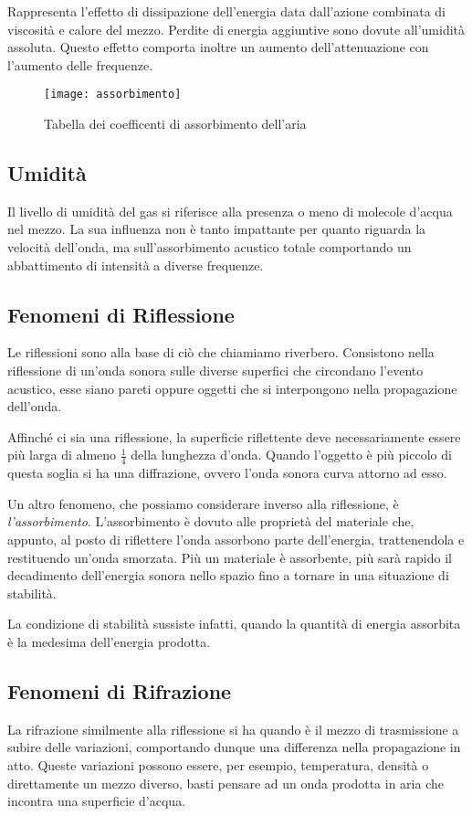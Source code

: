 Rappresenta l’effetto di dissipazione dell’energia data dall’azione combinata
di viscosità e calore del mezzo. Perdite di energia aggiuntive sono dovute
all’umidità assoluta. Questo effetto comporta inoltre un aumento
dell’attenuazione con l’aumento delle frequenze.

\begin{figure}[h]
\centering
\texttt{[image: assorbimento]}
\caption{Tabella dei coefficenti di assorbimento dell'aria}
\label{fig:assorbimento}
\end{figure}

\subsection{Umidità}
Il livello di umidità del gas si riferisce alla presenza o meno di molecole
d’acqua nel mezzo. La sua influenza non è tanto impattante per quanto riguarda
la velocità dell’onda, ma sull’assorbimento acustico totale comportando un
abbattimento di intensità a diverse frequenze.

\subsection{Fenomeni di Riflessione}

Le riflessioni sono alla base di ciò che chiamiamo riverbero. Consistono nella
riflessione di un’onda sonora sulle diverse superfici che circondano l’evento
acustico, esse siano pareti oppure oggetti che si interpongono nella
propagazione dell’onda.

Affinché ci sia una riflessione, la superficie riflettente deve necessariamente
essere più larga di almeno $\frac{1}{4}$ della lunghezza d’onda. Quando
l’oggetto è più piccolo di questa soglia si ha una diffrazione, ovvero l’onda
sonora curva attorno ad esso.

Un altro fenomeno, che possiamo considerare inverso alla riflessione, è
\emph{l’assorbimento}. L’assorbimento è dovuto alle proprietà del materiale che,
appunto, al posto di riflettere l’onda assorbono parte dell’energia,
trattenendola e restituendo un’onda smorzata. Più un materiale è assorbente,
più sarà rapido il decadimento dell’energia sonora nello spazio fino a tornare
in una situazione di stabilità.

La condizione di stabilità sussiste infatti, quando la quantità di energia
assorbita è la medesima dell’energia prodotta.

\subsection{Fenomeni di Rifrazione}

La rifrazione similmente alla riflessione si ha quando è il mezzo di
trasmissione a subire delle variazioni, comportando dunque una differenza nella
propagazione in atto. Queste variazioni possono essere, per esempio,
temperatura, densità o direttamente un mezzo diverso, basti pensare ad un onda
prodotta in aria che incontra una superficie d’acqua.
